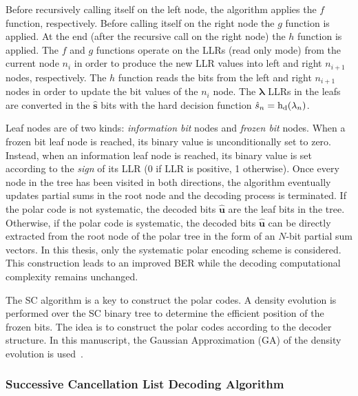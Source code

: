 Before recursively calling itself on the left node, the algorithm applies the
$f$ function, respectively. Before calling itself on the right node the $g$
function is applied. At the end (after the recursive call on the right node) the
$h$ function is applied. The $f$ and $g$ functions operate on the LLRs (read
only mode) from the current node $n_i$ in order to produce the new LLR values
into left and right $n_{i+1}$ nodes, respectively. The $h$ function reads the
bits from the left and right $n_{i+1}$ nodes in order to update the bit values
of the $n_i$ node. The $\bm{\lambda}$ LLRs in the leafs are converted in the
$\bm{\hat{s}}$ bits with the hard decision function $\hat{s}_n =
\operatorname{h_d}(\lambda_n)$.

Leaf nodes are of two kinds: \emph{information bit} nodes and \emph{frozen bit}
nodes. When a frozen bit leaf node is reached, its binary value is
unconditionally set to zero. Instead, when an information leaf node is reached,
its binary value is set according to the \emph{sign} of its LLR (0 if LLR is
positive, 1 otherwise). Once every node in the tree has been visited in both
directions, the algorithm eventually updates partial sums in the root node and
the decoding process is terminated. If the polar code is not systematic, the
decoded bits $\bm{\hat{u}}$ are the leaf bits in the tree. Otherwise, if the
polar code is systematic, the decoded bits $\bm{\hat{u}}$ can be directly
extracted from the root node of the polar tree in the form of an $N$-bit partial
sum vectors. In this thesis, only the systematic polar encoding scheme is
considered. This construction leads to an improved BER while the decoding
computational complexity remains unchanged.

The SC algorithm is a key to construct the polar codes. A density evolution
is performed over the SC binary tree to determine the efficient position of the
frozen bits. The idea is to construct the polar codes according to the decoder
structure. In this manuscript, the Gaussian Approximation (GA) of the density
evolution is used~\cite{Trifonov2012}.

\subsubsection{Successive Cancellation List Decoding Algorithm}


